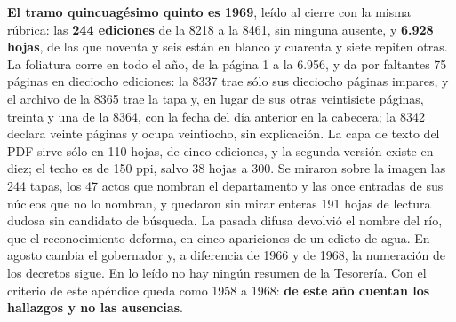 \textbf{El tramo quincuagésimo quinto es 1969}, leído al cierre con la misma rúbrica: las \textbf{244 ediciones} de la 8218 a la 8461, sin ninguna ausente, y \textbf{6.928 hojas}, de las que noventa y seis están en blanco y cuarenta y siete repiten otras. La foliatura corre en todo el año, de la página 1 a la 6.956, y da por faltantes 75 páginas en dieciocho ediciones: la 8337 trae sólo sus dieciocho páginas impares, y el archivo de la 8365 trae la tapa y, en lugar de sus otras veintisiete páginas, treinta y una de la 8364, con la fecha del día anterior en la cabecera; la 8342 declara veinte páginas y ocupa veintiocho, sin explicación. La capa de texto del PDF sirve sólo en 110 hojas, de cinco ediciones, y la segunda versión existe en diez; el techo es de 150 ppi, salvo 38 hojas a 300. Se miraron sobre la imagen las 244 tapas, los 47 actos que nombran el departamento y las once entradas de sus núcleos que no lo nombran, y quedaron sin mirar enteras 191 hojas de lectura dudosa sin candidato de búsqueda. La pasada difusa devolvió el nombre del río, que el reconocimiento deforma, en cinco apariciones de un edicto de agua. En agosto cambia el gobernador y, a diferencia de 1966 y de 1968, la numeración de los decretos sigue. En lo leído no hay ningún resumen de la Tesorería. Con el criterio de este apéndice queda como 1958 a 1968: \textbf{de este año cuentan los hallazgos y no las ausencias}.

